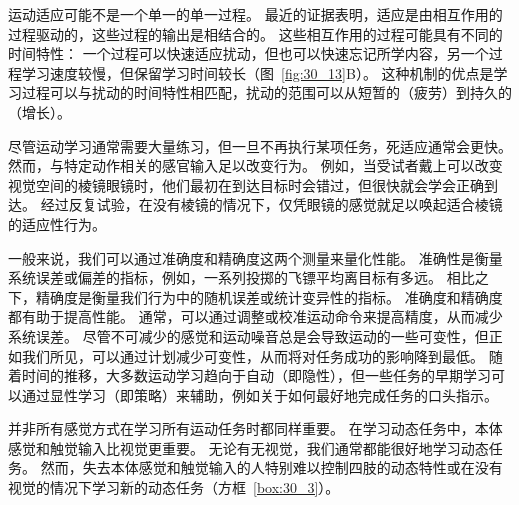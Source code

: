 运动适应可能不是一个单一的单一过程。
最近的证据表明，适应是由相互作用的过程驱动的，这些过程的输出是相结合的。
这些相互作用的过程可能具有不同的时间特性：
一个过程可以快速适应扰动，但也可以快速忘记所学内容，另一个过程学习速度较慢，但保留学习时间较长（图~\ref{fig:30_13}B）。
这种机制的优点是学习过程可以与扰动的时间特性相匹配，扰动的范围可以从短暂的（疲劳）到持久的（增长）。


尽管运动学习通常需要大量练习，但一旦不再执行某项任务，死适应通常会更快。
然而，与特定动作相关的感官输入足以改变行为。
例如，当受试者戴上可以改变视觉空间的棱镜眼镜时，他们最初在到达目标时会错过，但很快就会学会正确到达。
经过反复试验，在没有棱镜的情况下，仅凭眼镜的感觉就足以唤起适合棱镜的适应性行为。


一般来说，我们可以通过准确度和精确度这两个测量来量化性能。
准确性是衡量系统误差或偏差的指标，例如，一系列投掷的飞镖平均离目标有多远。
相比之下，精确度是衡量我们行为中的随机误差或统计变异性的指标。
准确度和精确度都有助于提高性能。
通常，可以通过调整或校准运动命令来提高精度，从而减少系统误差。
尽管不可减少的感觉和运动噪音总是会导致运动的一些可变性，但正如我们所见，可以通过计划减少可变性，从而将对任务成功的影响降到最低。
随着时间的推移，大多数运动学习趋向于自动（即隐性），但一些任务的早期学习可以通过显性学习（即策略）来辅助，例如关于如何最好地完成任务的口头指示。


并非所有感觉方式在学习所有运动任务时都同样重要。
在学习动态任务中，本体感觉和触觉输入比视觉更重要。 无论有无视觉，我们通常都能很好地学习动态任务。
然而，失去本体感觉和触觉输入的人特别难以控制四肢的动态特性或在没有视觉的情况下学习新的动态任务（方框~\ref{box:30_3}）。



